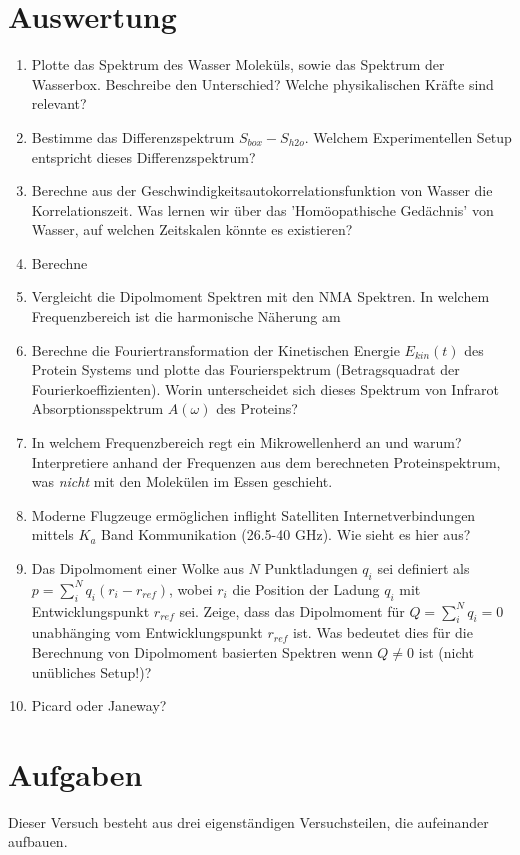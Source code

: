 \documentclass[a4paper,12pt]{article}
\begin{document}
\section*{Auswertung}
\begin{enumerate}
 \item Plotte das Spektrum des Wasser Moleküls, sowie das Spektrum der Wasserbox. Beschreibe den Unterschied? Welche physikalischen Kräfte sind relevant?
 \item Bestimme das Differenzspektrum $S_{box}-S_{h2o}$. Welchem Experimentellen Setup entspricht dieses Differenzspektrum?
 \item Berechne aus der Geschwindigkeitsautokorrelationsfunktion von Wasser die Korrelationszeit. Was lernen wir über das 'Homöopathische Gedächnis' von Wasser, auf welchen Zeitskalen könnte es existieren?
 \item Berechne
 \item Vergleicht die Dipolmoment Spektren mit den NMA Spektren. In welchem Frequenzbereich ist die harmonische Näherung am
 \item Berechne die Fouriertransformation der Kinetischen Energie $E_{kin}(t)$ des Protein Systems und plotte das Fourierspektrum (Betragsquadrat der Fourierkoeffizienten). Worin unterscheidet sich dieses
 Spektrum von Infrarot Absorptionsspektrum $A(\omega)$ des Proteins?
 \item In welchem Frequenzbereich regt ein Mikrowellenherd an und warum? Interpretiere anhand der Frequenzen aus dem berechneten Proteinspektrum, was \emph{nicht} mit den Molekülen im Essen geschieht. 
 \item Moderne Flugzeuge ermöglichen inflight Satelliten Internetverbindungen mittels $K_a$ Band Kommunikation (26.5-40 GHz). Wie sieht es hier aus?
 \item Das Dipolmoment einer Wolke aus $N$ Punktladungen $q_i$ sei definiert als $p=\sum_i^N q_i (r_i-r_{ref})$, wobei $r_i$ die Position der Ladung $q_i$
 mit Entwicklungspunkt $r_{ref}$ sei. Zeige, dass das Dipolmoment für $Q=\sum_i^N q_i=0$ unabhänging vom Entwicklungspunkt $r_{ref}$ ist. Was bedeutet dies für
 die Berechnung von Dipolmoment basierten Spektren wenn $Q\neq0$ ist (nicht unübliches Setup!)?
 \item Picard oder Janeway? 
\end{enumerate}

\section*{Aufgaben}
Dieser Versuch besteht aus drei eigenst\"andigen Versuchsteilen, die aufeinander aufbauen.
\end{document}
